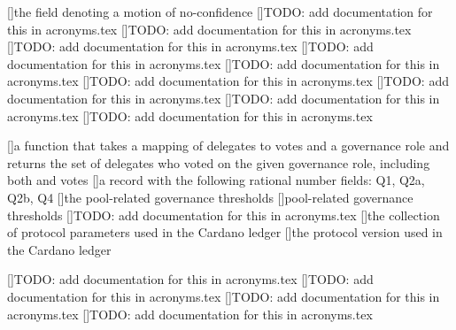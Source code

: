 [\protect{}]{the field denoting a motion of no-confidence}
[\protect{}]{TODO: add documentation for this in acronyms.tex}
[\protect{}]{TODO: add documentation for this in acronyms.tex}
[\protect{}]{TODO: add documentation for this in acronyms.tex}
[\protect{}]{TODO: add documentation for this in acronyms.tex}
[\protect{}]{TODO: add documentation for this in acronyms.tex}
[\protect{}]{TODO: add documentation for this in acronyms.tex}
[\protect{}]{TODO: add documentation for this in acronyms.tex}
[\protect{}]{TODO: add documentation for this in acronyms.tex}
[\protect{}]{TODO: add documentation for this in acronyms.tex}

[\protect{}]{a function that takes a mapping of delegates to votes and a governance role and returns the set of delegates who voted on the given governance role, including both \yes and \no votes}
[\protect{}]{a record with the following rational number fields:
  \acs{Q1}, \acs{Q2a}, \acs{Q2b}, \acs{Q4}}
[\protect{}]{the pool-related governance thresholds}
[\protect{}]{pool-related governance thresholds}
[\protect{}]{TODO: add documentation for this in acronyms.tex}
[\protect{}]{the collection of protocol parameters used in the Cardano ledger}
[\protect{}]{the protocol version used in the Cardano ledger}

[\protect{}]{TODO: add documentation for this in acronyms.tex}
[\protect{}]{TODO: add documentation for this in acronyms.tex}
[\protect{}]{TODO: add documentation for this in acronyms.tex}
[\protect{}]{TODO: add documentation for this in acronyms.tex}

